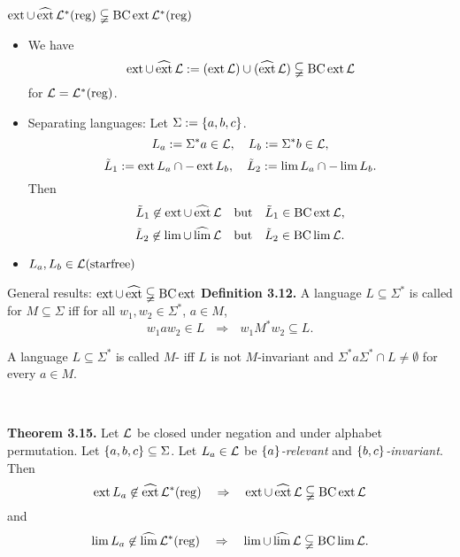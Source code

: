 \documentclass[
	handout,
	notheorems,noamsthm]{beamer}
\begin{document}
\begin{frame}[<+->]{$\operatorname{ext} \cup \operatorname{\widehat{ext}} \mathcal{L}^*(\textup{\textrm{reg}}) \subsetneqq \operatorname{BC} \operatorname{ext} \mathcal{L}^*(\textup{\textrm{reg}})$}
\begin{itemize}
\item
We have
\[ \operatorname{ext} \cup \operatorname{\widehat{ext}} \mathcal{L} := (\operatorname{ext} \mathcal{L}) \cup (\operatorname{\widehat{ext}} \mathcal{L}) \subsetneqq \operatorname{BC} \operatorname{ext} \mathcal{L} \]
for $\mathcal{L} = \mathcal{L}^*(\textup{\textrm{reg}})$.

\item
Separating languages: Let $\Sigma := \Set{a,b,c}$.
\[ L_a := \Sigma^* a \in \mathcal{L}, \ \ \ L_b := \Sigma^* b \in \mathcal{L}, \]
\[ \tilde L_1 := \ext L_a \cap -\ext L_b, \ \ \ \tilde L_2 := \lim L_a \cap -\lim L_b . \]
Then
\[ \tilde L_1 \not\in \ext \cup \dext \Lang \ \ \text{ but } \ \ \tilde L_1 \in \BC \ext \Lang , \]
\[ \tilde L_2 \not\in \lim \cup \dlim \Lang \ \ \text{ but } \ \ \tilde L_2 \in \BC \lim \Lang . \]

\item
$L_a,L_b \in \mathcal{L}(\textup{\textrm{starfree}})$
\end{itemize}
\end{frame}

\begin{frame}[<+->]{General results: $\operatorname{ext} \cup \operatorname{\widehat{ext}} \subsetneqq \operatorname{BC} \operatorname{ext}$}
\textbf{Definition 3.12.} A language $L \subseteq \Sigma^*$ is called  for $M \subseteq\Sigma$ iff for all $w_1,w_2 \in \Sigma^*$, $a \in M$,
\[ w_1 a w_2 \in L \ \ \ \Rightarrow \ \ \  w_1 M^* w_2 \subseteq L . \]

A language $L \subseteq \Sigma^*$ is called $M$- iff $L$ is not $M$-invariant and $\Sigma^* a \Sigma^* \cap L \ne \emptyset$ for every $a \in M$.

\

\textbf{Theorem 3.15.} Let $\mathcal{L}$ be closed under negation and under alphabet permutation. Let $\Set{a,b,c} \subseteq \Sigma$. Let $L_a \in \mathcal{L}$ be \emph{$\Set{a}$-relevant} and \emph{$\Set{b,c}$-invariant}. Then
\[ \operatorname{ext} L_a \not\in \operatorname{\widehat{ext}} \mathcal{L}^*(\textup{\textrm{reg}}) \ \ \ \Rightarrow \ \ \ \operatorname{ext} \cup \operatorname{\widehat{ext}} \mathcal{L} \subsetneqq \operatorname{BC} \operatorname{ext} \mathcal{L} \]
and
\[ \lim L_a \not\in \dlim \Langreg \ \ \ \Rightarrow \ \ \ \lim \cup \dlim \Lang \subsetneqq \BC \lim \Lang . \]
\end{frame}
\end{document}
